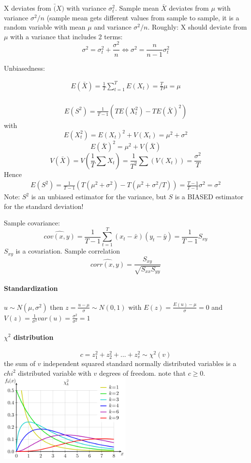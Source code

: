 \documentclass{article}
\begin{document}
X deviates from $\bar(X)$ with variance $\sigma_t^2$. Sample mean $\bar{X}$ deviates from $\mu$ with variance $\sigma^2/n$ (sample mean gets different values from sample to sample, it is a random variable with mean $\mu$ and variance $\sigma^2/n$. Roughly: X should deviate from $\mu$ with a variance that includes 2 terms:
$$\sigma^2 = \sigma_t^2 + \frac{\sigma^2}{n} \Leftrightarrow \sigma^2 = \frac{n}{n-1} \sigma_t^2$$

Unbiasedness:

\begin{align*}
E(\bar{X}) = \frac{1}{T} \sum_{t=1}^{T} E(X_t) = \frac{T}{T} \mu = \mu\\
\end{align*}

\begin{align*}
E(S^2) = \frac{1}{T-1} \left(T E(X_t^2) - T E(\bar{X})^2\right)
\end{align*}
with
$$E(X_t^2) = E(X_t)^2 + V(X_t) = \mu^2 + \sigma^2$$
$$E(\bar{X})^2 = \mu^2 + V(\bar{X})$$
$$V(\bar{X}) = V(\frac{1}{T} \sum X_t) = \frac{1}{T^2} \sum(V(X_t)) = \frac{\sigma^2}{T}$$
Hence
\begin{align*}
E(S^2) = \frac{1}{T-1} \left(T (\mu^2 + \sigma^2) - T (\mu^2 + \sigma^2/T)\right) = \frac{T-1}{T-1} \sigma^2 = \sigma^2
\end{align*}
Note: $S^2$ is an unbiased estimator for the variance, but $S$ is a BIASED estimator for the standard deviation!

Sample covariance:
$$\widehat{cov(x,y)} = \frac{1}{T-1}\sum_{t=1}^T (x_t -\bar{x})(y_t - \bar{y}) = \frac{1}{T-1} S_{xy}$$
$S_{xy}$ is a covariation. Sample correlation
$$\widehat{corr(x,y)} = \frac{S_{xy}}{\sqrt{S_{xx}S_{yy}}}$$
\paragraph{Standardization}
$u\sim N(\mu,\sigma^2)$ then $z=\frac{u-\mu}{\sigma} \sim N(0,1)$ with $E(z)=\frac{E(u)-\mu}{\sigma}=0$ and $V(z)=\frac{1}{\sigma^2}var(u) = \frac{\sigma^2}{\sigma^2}=1$
\paragraph{$\chi^2$ distribution}
$$c = z_1^2 + z_2^2 + ... + z_v^2 \sim \chi^2(v)$$
the sum of $v$ independent squared standard normally distributed variables is a $chi^2$ distributed variable with $v$ degrees of freedom. note that $c\geq0$.
\includegraphics[width=0.5\textwidth]{plots/Chi-square_pdf.png}
\end{document}
